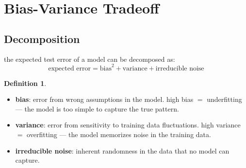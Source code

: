 \documentclass[11pt,a4paper]{article}
\theoremstyle{definition}
\newtheorem{definition}{Definition}[section]
\theoremstyle{remark}
\begin{document}
\section{Bias-Variance Tradeoff}

\subsection{Decomposition}

the expected test error of a model can be decomposed as:
\[
\boxed{\text{expected error} = \text{bias}^2 + \text{variance} + \text{irreducible noise}}
\]

\begin{definition}
\begin{itemize}
    \item \textbf{bias}: error from wrong assumptions in the model. high bias $=$ underfitting --- the model is too simple to capture the true pattern.
    \item \textbf{variance}: error from sensitivity to training data fluctuations. high variance $=$ overfitting --- the model memorizes noise in the training data.
    \item \textbf{irreducible noise}: inherent randomness in the data that no model can capture.
\end{itemize}
\end{definition}

\begin{center}
\end{center}
\end{document}
